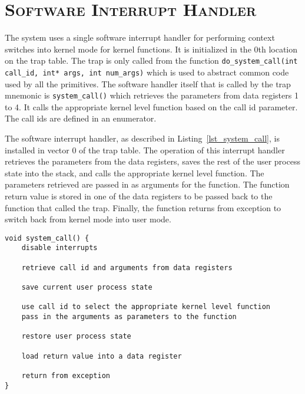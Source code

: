 \documentclass[oneside]{report}
\begin{document}
\section{\textsc{Software Interrupt Handler}}
\label{sec:soft_isr}

The system uses a single software interrupt handler for performing context
switches into kernel mode for kernel functions. It is initialized in the 0th
location on the trap table. The trap is only called from the function
\texttt{do\_system\_call(int call\_id, int* args, int num\_args)} which is used
to abstract common code used by all the primitives. The software handler itself
that is called by the trap mnemonic is \texttt{system\_call()} which retrieves
the parameters from data registers 1 to 4. It calls the appropriate kernel
level function based on the call id parameter. The call ids are defined in an
enumerator. 

The software interrupt handler, as described in Listing~\ref{lst_system_call},
is installed in vector 0 of the trap table. The operation of this interrupt
handler retrieves the parameters from the data registers, saves the rest of
the user process state into the stack, and calls the appropriate kernel level
function. The parameters retrieved are passed in as arguments for the function.
The function return value is stored in one of the data registers to be passed
back to the function that called the trap. Finally, the function returns from
exception to switch back from kernel mode into user mode.

\begin{lstlisting}
void system_call() {
    disable interrupts

    retrieve call id and arguments from data registers

    save current user process state

    use call id to select the appropriate kernel level function 
    pass in the arguments as parameters to the function

    restore user process state

    load return value into a data register

    return from exception
}
\end{lstlisting}
\end{document}
